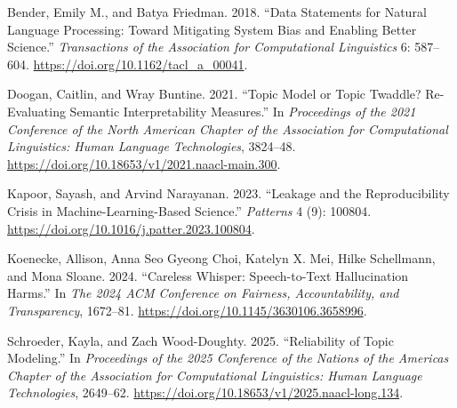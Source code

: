 \documentclass[
  11pt,
]{article}
\newlength{\cslhangindent}
\newenvironment{CSLReferences}[2] %
 {\begin{list}{}{%
  \setlength{\itemindent}{0pt}
  \setlength{\leftmargin}{0pt}
  \setlength{\parsep}{0pt}
  \ifodd #1
   \setlength{\leftmargin}{\cslhangindent}
   \setlength{\itemindent}{-1\cslhangindent}
  \fi
  \setlength{\itemsep}{#2\baselineskip}}}
 {\end{list}}
\begin{document}
\label{refs}
\begin{CSLReferences}{1}{0}
Bender, Emily M., and Batya Friedman. 2018. {``Data Statements for
Natural Language Processing: Toward Mitigating System Bias and Enabling
Better Science.''} \emph{Transactions of the Association for
Computational Linguistics} 6: 587--604.
\url{https://doi.org/10.1162/tacl_a_00041}.

Doogan, Caitlin, and Wray Buntine. 2021. {``Topic Model or Topic
Twaddle? Re-Evaluating Semantic Interpretability Measures.''} In
\emph{Proceedings of the 2021 Conference of the North American Chapter
of the Association for Computational Linguistics: Human Language
Technologies}, 3824--48.
\url{https://doi.org/10.18653/v1/2021.naacl-main.300}.

Kapoor, Sayash, and Arvind Narayanan. 2023. {``Leakage and the
Reproducibility Crisis in Machine-Learning-Based Science.''}
\emph{Patterns} 4 (9): 100804.
\url{https://doi.org/10.1016/j.patter.2023.100804}.

Koenecke, Allison, Anna Seo Gyeong Choi, Katelyn X. Mei, Hilke
Schellmann, and Mona Sloane. 2024. {``Careless Whisper: Speech-to-Text
Hallucination Harms.''} In \emph{The 2024 ACM Conference on Fairness,
Accountability, and Transparency}, 1672--81.
\url{https://doi.org/10.1145/3630106.3658996}.

Schroeder, Kayla, and Zach Wood-Doughty. 2025. {``Reliability of Topic
Modeling.''} In \emph{Proceedings of the 2025 Conference of the Nations
of the Americas Chapter of the Association for Computational
Linguistics: Human Language Technologies}, 2649--62.
\url{https://doi.org/10.18653/v1/2025.naacl-long.134}.

\end{CSLReferences}
\end{document}
